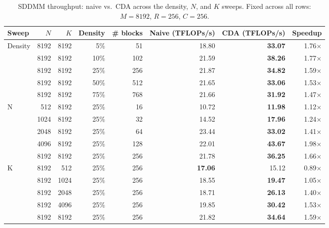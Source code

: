 \begin{table}[h]
\centering
\caption{SDDMM throughput: naive vs.\ CDA across the density, $N$, and $K$ sweeps. Fixed across all rows: $M=8192$, $R=256$, $C=256$.}
\label{tab:sddmm_naive_vs_cda}
\begin{tabular}{lrrrrrrr}
\toprule
Sweep & $N$ & $K$ & Density & \# blocks & Naive (TFLOPs/s) & CDA (TFLOPs/s) & Speedup \\
\midrule
\multirow{5}{*}{Density} & 8192 & 8192 & 5\% & 51 & 18.80 & \textbf{33.07} & 1.76$\times$ \\
 & 8192 & 8192 & 10\% & 102 & 21.59 & \textbf{38.26} & 1.77$\times$ \\
 & 8192 & 8192 & 25\% & 256 & 21.87 & \textbf{34.82} & 1.59$\times$ \\
 & 8192 & 8192 & 50\% & 512 & 21.65 & \textbf{33.06} & 1.53$\times$ \\
 & 8192 & 8192 & 75\% & 768 & 21.66 & \textbf{31.92} & 1.47$\times$ \\
\midrule
\multirow{5}{*}{N} & 512 & 8192 & 25\% & 16 & 10.72 & \textbf{11.98} & 1.12$\times$ \\
 & 1024 & 8192 & 25\% & 32 & 14.52 & \textbf{17.96} & 1.24$\times$ \\
 & 2048 & 8192 & 25\% & 64 & 23.44 & \textbf{33.02} & 1.41$\times$ \\
 & 4096 & 8192 & 25\% & 128 & 22.01 & \textbf{43.67} & 1.98$\times$ \\
 & 8192 & 8192 & 25\% & 256 & 21.78 & \textbf{36.25} & 1.66$\times$ \\
\midrule
\multirow{5}{*}{K} & 8192 & 512 & 25\% & 256 & \textbf{17.06} & 15.12 & 0.89$\times$ \\
 & 8192 & 1024 & 25\% & 256 & 18.55 & \textbf{19.47} & 1.05$\times$ \\
 & 8192 & 2048 & 25\% & 256 & 18.71 & \textbf{26.13} & 1.40$\times$ \\
 & 8192 & 4096 & 25\% & 256 & 19.85 & \textbf{30.42} & 1.53$\times$ \\
 & 8192 & 8192 & 25\% & 256 & 21.82 & \textbf{34.64} & 1.59$\times$ \\
\bottomrule
\end{tabular}
\end{table}
